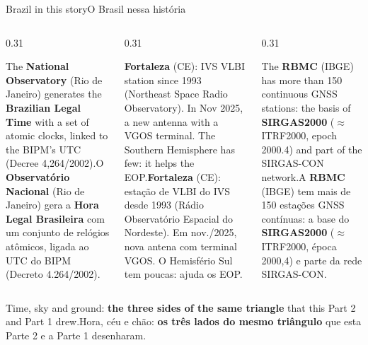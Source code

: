 \documentclass[aspectratio=169,11pt]{beamer}
\newcommand{\tr}[2]{\ifEN#2\else#1\fi}
\newcommand{\bnum}[1]{\textbf{\textcolor{mTeal}{#1}}}
\begin{document}
\begin{frame}{\tr{O Brasil nessa história}{Brazil in this story}}
  \small
  \begin{columns}[T]
    \begin{column}{0.31\textwidth}
      \begin{cuidado}[title={\tr{A hora}{The time}}]
        \footnotesize\raggedright\tr{O \bnum{Observatório Nacional} (Rio de Janeiro) gera a \bnum{Hora Legal Brasileira} com um conjunto de relógios atômicos, ligada ao UTC do BIPM (Decreto 4.264/2002).}{The \bnum{National Observatory} (Rio de Janeiro) generates the \bnum{Brazilian Legal Time} with a set of atomic clocks, linked to the BIPM's UTC (Decree 4,264/2002).}
      \end{cuidado}
    \end{column}
    \begin{column}{0.31\textwidth}
      \begin{regra}[title={\tr{O céu}{The sky}}]
        \footnotesize\raggedright\tr{\bnum{Fortaleza} (CE): estação de VLBI do IVS desde 1993 (Rádio Observatório Espacial do Nordeste). Em nov./2025, nova antena com terminal VGOS. O Hemisfério Sul tem poucas: ajuda os EOP.}{\bnum{Fortaleza} (CE): IVS VLBI station since 1993 (Northeast Space Radio Observatory). In Nov 2025, a new antenna with a VGOS terminal. The Southern Hemisphere has few: it helps the EOP.}
      \end{regra}
    \end{column}
    \begin{column}{0.31\textwidth}
      \begin{ideia}[title={\tr{O chão}{The ground}}]
        \footnotesize\raggedright\tr{A \bnum{RBMC} (IBGE) tem mais de 150 estações GNSS contínuas: a base do \bnum{SIRGAS2000} ($\approx$ ITRF2000, época 2000,4) e parte da rede SIRGAS-CON.}{The \bnum{RBMC} (IBGE) has more than 150 continuous GNSS stations: the basis of \bnum{SIRGAS2000} ($\approx$ ITRF2000, epoch 2000.4) and part of the SIRGAS-CON network.}
      \end{ideia}
    \end{column}
  \end{columns}
  \bigskip

  \centering
  \tr{Hora, céu e chão: \bnum{os três lados do mesmo triângulo} que esta Parte 2 e a Parte 1 desenharam.}{Time, sky and ground: \bnum{the three sides of the same triangle} that this Part 2 and Part 1 drew.}
\end{frame}
\end{document}
